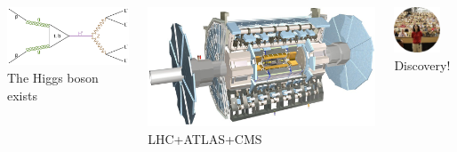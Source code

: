 \documentclass{beamer}
\begin{document}
\begin{frame}
    \begin{columns}[t]
        \begin{column}{0.23\textwidth}
            \centering
            \includegraphics[width=\textwidth]{figures/higgs.png}\\
            {\scriptsize The Higgs boson exists}
        \end{column}
        \begin{column}{0.23\textwidth}
            \centering
            \includegraphics[width=\textwidth]{figures/atlas.jpg}\\
            {\scriptsize LHC+ATLAS+CMS}
        \end{column}
        \begin{column}{0.23\textwidth}
            \centering
            \includegraphics[width=0.75\textwidth]{figures/discovery.png}\\
            {\scriptsize Discovery!}
        \end{column}
    \end{columns}


\end{frame}
\end{document}
